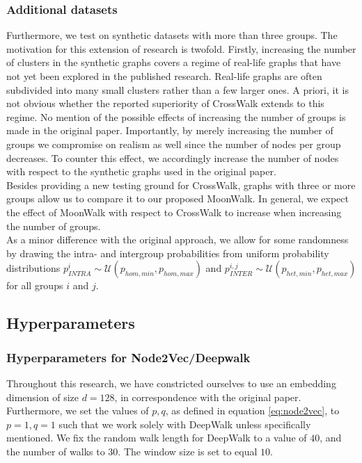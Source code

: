 \subsubsection{Additional datasets} 
Furthermore, we test on synthetic datasets with more than three groups. The motivation for this extension of research is twofold. Firstly, increasing the number of clusters in the synthetic graphs covers a regime of real-life graphs that have not yet been explored in the published research. Real-life graphs are often subdivided into many small clusters rather than a few larger ones. A priori, it is not obvious whether the reported superiority of CrossWalk extends to this regime. No mention of the possible effects of increasing the number of groups is made in the original paper. Importantly, by merely increasing the number of groups we compromise on realism as well since the number of nodes per group decreases. To counter this effect, we accordingly increase the number of nodes with respect to the synthetic graphs used in the original paper.\\
Besides providing a new testing ground for CrossWalk, graphs with three or more groups allow us to compare it to our proposed MoonWalk. In general, we expect the effect of MoonWalk with respect to CrossWalk to increase when increasing the number of groups.\\
 As a minor difference with the original approach, we allow for some randomness by drawing the intra- and intergroup probabilities from uniform probability distributions $p^{i}_{INTRA} \sim \mathcal{U}(p_{hom, min}, p_{hom, max})$ and $p^{i,j}_{INTER} \sim \mathcal{U}(p_{het, min}, p_{het, max})$ for all groups ${i}$ and ${j}$.



\subsection{Hyperparameters}
\subsubsection{Hyperparameters for Node2Vec/Deepwalk}
Throughout this research, we have constricted ourselves to use an embedding dimension of size $d = 128$, in correspondence with the original paper.
Furthermore, we set the values of $p,q$, as defined in equation \eqref{eq:node2vec}, to $p=1, q=1$ such that we work solely with DeepWalk unless specifically mentioned.
We fix the random walk length for DeepWalk to a value of $40$, and the number of walks to $30$. The window size is set to equal $10$.

